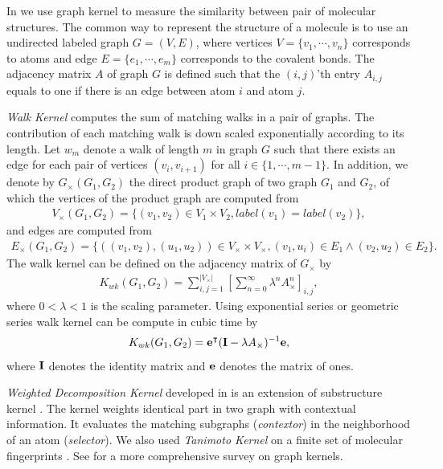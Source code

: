 {%
In  we use graph kernel to measure the similarity between pair of molecular structures.
The common way to represent the structure of a molecule is to use an undirected labeled graph $G=(V,E)$, where vertices $V=\{v_1,\cdots,v_n\}$ corresponds to atoms and edge $E=\{e_1,\cdots,e_m\}$ corresponds to the covalent bonds.
The adjacency matrix $A$ of graph $G$ is defined such that the $(i,j)$'th entry $A_{i,j}$ equals to one if there is an edge between atom $i$ and atom $j$.

\textit{Walk Kernel} \citep{Kashima03marginalized,Gartner03a} computes the sum of matching walks in a pair of graphs. 
The contribution of each matching walk is down scaled exponentially according to its length.  
Let $w_m$ denote a walk of length $m$ in graph $G$ such that there exists an edge for each pair of vertices $(v_i,v_{i+1})$ for all $i\in\{1,\cdots,m-1\}$.
In addition, we denote by $G_{\times}(G_1,G_2)$ the direct product graph of two graph $G_1$ and $G_2$, of which the vertices of the product graph are computed from 
\begin{align*}
	V_{\times}(G_1,G_2) = \{(v_1,v_2)\in V_1\times V_2, label(v_1)=label(v_2)\},
\end{align*}
and edges are computed from
\begin{align*}
	E_{\times}(G_1,G_2) = \{((v_1,v_2),(u_1,u_2))\in V_{\times}\times V_{\times},(v_1,u_i)\in E_1\wedge (v_2,u_2)\in E_2\}.
\end{align*}
The walk kernel can be defined on the adjacency matrix of $G_{\times}$ by
\begin{align*}
	K_{wk}(G_1,G_2) = \sum_{i,j=1}^{|V_{\times}|}\left[\sum_{n=0}^{\infty}\lambda^{n}A_{\times}^n\right]_{i,j},
\end{align*}
where $0<\lambda<1$ is the scaling parameter.
Using exponential series or geometric series walk kernel can be compute in cubic time \citep{Gartner03a} by
\begin{align*}
	K_{wk}(G_1,G_2) = \mathbf {e}^{\intercal}(\mathbf{I}-\lambda A_{\times})^{-1}\mathbf {e},
\end{align*}
where $\mathbf{I}$ denotes the identity matrix and $\mathbf {e}$ denotes the matrix of ones.

\textit{Weighted Decomposition Kernel} developed in \citep{Menchetti05weighted,Ceroni08classification} is an extension of substructure kernel \citep{Haussler99convolution}.
The kernel weights identical part in two graph with contextual information.
It evaluates the matching subgraphs (\textit{contextor}) in the neighborhood of an atom (\textit{selector}).
We also used \textit{Tanimoto Kernel} \citep{Ralaivola05graph} on a finite set of molecular fingerprints \citep{Wang09pubchem}.
See \citep{Vishwanathan10graph} for a more comprehensive survey on graph kernels.

}

